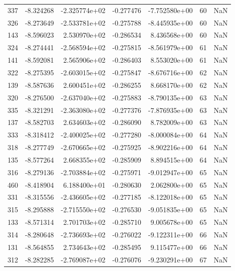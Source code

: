 \begin{tabular}{rrrrrrr}
 337 &  -8.324268 & -2.325774e+02 & -0.277476 & -7.752580e+00 &          60 & NaN \\
 326 &  -8.273649 & -2.533781e+02 & -0.275788 & -8.445935e+00 &          60 & NaN \\
 143 &  -8.596023 &  2.530970e+02 & -0.286534 &  8.436568e+00 &          60 & NaN \\
 324 &  -8.274441 & -2.568594e+02 & -0.275815 & -8.561979e+00 &          61 & NaN \\
 141 &  -8.592081 &  2.565906e+02 & -0.286403 &  8.553020e+00 &          61 & NaN \\
 322 &  -8.275395 & -2.603015e+02 & -0.275847 & -8.676716e+00 &          62 & NaN \\
 139 &  -8.587636 &  2.600451e+02 & -0.286255 &  8.668170e+00 &          62 & NaN \\
 320 &  -8.276500 & -2.637040e+02 & -0.275883 & -8.790135e+00 &          63 & NaN \\
 335 &  -8.321291 & -2.363080e+02 & -0.277376 & -7.876935e+00 &          63 & NaN \\
 137 &  -8.582703 &  2.634603e+02 & -0.286090 &  8.782009e+00 &          63 & NaN \\
 333 &  -8.318412 & -2.400025e+02 & -0.277280 & -8.000084e+00 &          64 & NaN \\
 318 &  -8.277749 & -2.670665e+02 & -0.275925 & -8.902216e+00 &          64 & NaN \\
 135 &  -8.577264 &  2.668355e+02 & -0.285909 &  8.894515e+00 &          64 & NaN \\
 316 &  -8.279136 & -2.703884e+02 & -0.275971 & -9.012947e+00 &          65 & NaN \\
 460 &  -8.418904 &  6.188400e+01 & -0.280630 &  2.062800e+00 &          65 & NaN \\
 331 &  -8.315556 & -2.436605e+02 & -0.277185 & -8.122018e+00 &          65 & NaN \\
 315 &  -8.295888 & -2.715550e+02 & -0.276530 & -9.051835e+00 &          65 & NaN \\
 133 &  -8.571314 &  2.701703e+02 & -0.285710 &  9.005678e+00 &          65 & NaN \\
 314 &  -8.280648 & -2.736693e+02 & -0.276022 & -9.122311e+00 &          66 & NaN \\
 131 &  -8.564855 &  2.734643e+02 & -0.285495 &  9.115477e+00 &          66 & NaN \\
 312 &  -8.282285 & -2.769087e+02 & -0.276076 & -9.230291e+00 &          67 & NaN \\

\end{tabular}
